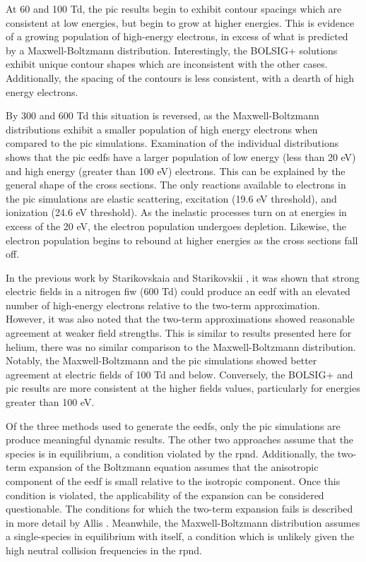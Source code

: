 At 60 and 100 Td, the \acs{pic} results begin to exhibit contour spacings which
are consistent at low energies, but begin to grow at higher energies. This is
evidence of a growing population of high-energy electrons, in excess of what is
predicted by a Maxwell-Boltzmann distribution. Interestingly, the BOLSIG+
solutions exhibit unique contour shapes which are inconsistent with the other
cases. Additionally, the spacing of the contours is less consistent, with a
dearth of high energy electrons. 

By 300 and 600 Td this situation is reversed, as the Maxwell-Boltzmann
distributions exhibit a smaller population of high energy electrons when
compared to the \acs{pic} simulations. Examination of the individual
distributions shows that the \acs{pic} \acs{eedf}s have a larger population of
low energy (less than 20 eV) and high energy (greater than 100 eV) electrons.
This can be explained by the general shape of the cross sections. The only
reactions available to electrons in the \acs{pic} simulations are elastic
scattering, excitation (19.6 eV threshold), and ionization (24.6 eV threshold).
As the inelastic processes turn on at energies in excess of the 20 eV, the
electron population undergoes depletion. Likewise, the electron population
begins to rebound at higher energies as the cross sections fall off.

In the previous work by Starikovskaia and Starikovskii \cite{Starikovskaia2001a},
it was shown that strong electric fields in a nitrogen \acs{fiw} (600 Td) could
produce an \acs{eedf} with an elevated number of high-energy electrons relative
to the two-term approximation. However, it was also noted that the two-term
approximations showed reasonable agreement at weaker field strengths. This is
similar to results presented here for helium, there was no similar comparison to
the Maxwell-Boltzmann distribution. Notably, the Maxwell-Boltzmann and the
\acs{pic} simulations showed better agreement at electric fields of 100 Td
and below. Conversely, the BOLSIG+ and \acs{pic} results are more consistent at
the higher fields values, particularly for energies greater than 100 eV.

Of the three methods used to generate the \acs{eedf}s, only the \acs{pic}
simulations are produce meaningful dynamic results. The other two approaches
assume that the species is in equilibrium, a condition violated by the
\acs{rpnd}. Additionally, the two-term expansion of the Boltzmann equation
assumes that the anisotropic component of the \acs{eedf} is small relative to
the isotropic component. Once this condition is violated, the applicability of
the expansion can be considered questionable. The conditions for which the
two-term expansion fails is described in more detail by Allis \cite{Allis1982}.
Meanwhile, the Maxwell-Boltzmann distribution assumes a single-species in
equilibrium with itself, a condition which is unlikely given the high neutral
collision frequencies in the \acs{rpnd}.

